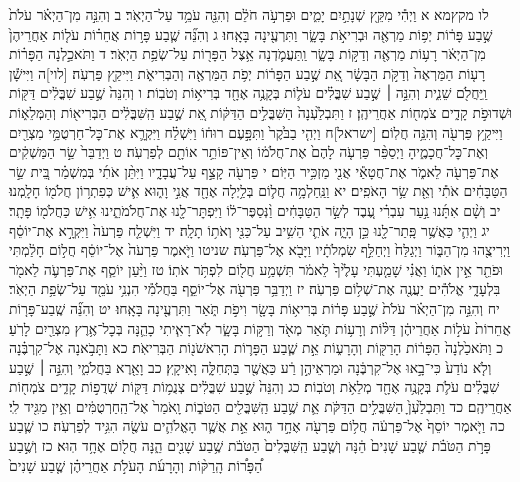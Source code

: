 \documentclass[twoside, openany, parskip=half, 11pt]{book}
\begin{document}
לו מקץמא א וַיְהִ֕י מִקֵּ֖ץ שְׁנָתַ֣יִם יָמִ֑ים וּפַרְעֹ֣ה חֹלֵ֔ם וְהִנֵּ֖ה עֹמֵ֥ד עַל־הַיְאֹֽר׃ ב וְהִנֵּ֣ה מִן־הַיְאֹ֗ר עֹלֹת֙ שֶׁ֣בַע פָּר֔וֹת יְפ֥וֹת מַרְאֶ֖ה וּבְרִיאֹ֣ת בָּשָׂ֑ר וַתִּרְעֶ֖ינָה בָּאָֽחוּ׃ ג וְהִנֵּ֞ה שֶׁ֧בַע פָּר֣וֹת אֲחֵר֗וֹת עֹל֤וֹת אַחֲרֵיהֶן֙ מִן־הַיְאֹ֔ר רָע֥וֹת מַרְאֶ֖ה וְדַקּ֣וֹת בָּשָׂ֑ר וַֽתַּעֲמֹ֛דְנָה אֵ֥צֶל הַפָּר֖וֹת עַל־שְׂפַ֥ת הַיְאֹֽר׃ ד וַתֹּאכַ֣לְנָה הַפָּר֗וֹת רָע֤וֹת הַמַּרְאֶה֙ וְדַקֹּ֣ת הַבָּשָׂ֔ר אֵ֚ת שֶׁ֣בַע הַפָּר֔וֹת יְפֹ֥ת הַמַּרְאֶ֖ה וְהַבְּרִיאֹ֑ת וַיִּיקַ֖ץ פַּרְעֹֽה׃ [לוי]ה וַיִּישָׁ֕ן וַֽיַּחֲלֹ֖ם שֵׁנִ֑ית וְהִנֵּ֣ה ׀ שֶׁ֣בַע שִׁבֳּלִ֗ים עֹל֛וֹת בְּקָנֶ֥ה אֶחָ֖ד בְּרִיא֥וֹת וְטֹבֽוֹת׃ ו וְהִנֵּה֙ שֶׁ֣בַע שִׁבֳּלִ֔ים דַּקּ֖וֹת וּשְׁדוּפֹ֣ת קָדִ֑ים צֹמְח֖וֹת אַחֲרֵיהֶֽן׃ ז וַתִּבְלַ֙עְנָה֙ הַשִּׁבֳּלִ֣ים הַדַּקּ֔וֹת אֵ֚ת שֶׁ֣בַע הַֽשִּׁבֳּלִ֔ים הַבְּרִיא֖וֹת וְהַמְּלֵא֑וֹת וַיִּיקַ֥ץ פַּרְעֹ֖ה וְהִנֵּ֥ה חֲלֽוֹם׃ [ישראל]ח וַיְהִ֤י בַבֹּ֙קֶר֙ וַתִּפָּ֣עֶם רוּח֔וֹ וַיִּשְׁלַ֗ח וַיִּקְרָ֛א אֶת־כׇּל־חַרְטֻמֵּ֥י מִצְרַ֖יִם וְאֶת־כׇּל־חֲכָמֶ֑יהָ וַיְסַפֵּ֨ר פַּרְעֹ֤ה לָהֶם֙ אֶת־חֲלֹמ֔וֹ וְאֵין־פּוֹתֵ֥ר אוֹתָ֖ם לְפַרְעֹֽה׃ ט וַיְדַבֵּר֙ שַׂ֣ר הַמַּשְׁקִ֔ים אֶת־פַּרְעֹ֖ה לֵאמֹ֑ר אֶת־חֲטָאַ֕י אֲנִ֖י מַזְכִּ֥יר הַיּֽוֹם׃ י פַּרְעֹ֖ה קָצַ֣ף עַל־עֲבָדָ֑יו וַיִּתֵּ֨ן אֹתִ֜י בְּמִשְׁמַ֗ר בֵּ֚ית שַׂ֣ר הַטַּבָּחִ֔ים אֹתִ֕י וְאֵ֖ת שַׂ֥ר הָאֹפִֽים׃ יא וַנַּֽחַלְמָ֥ה חֲל֛וֹם בְּלַ֥יְלָה אֶחָ֖ד אֲנִ֣י וָה֑וּא אִ֛ישׁ כְּפִתְר֥וֹן חֲלֹמ֖וֹ חָלָֽמְנוּ׃ יב וְשָׁ֨ם אִתָּ֜נוּ נַ֣עַר עִבְרִ֗י עֶ֚בֶד לְשַׂ֣ר הַטַּבָּחִ֔ים וַ֨נְּסַפֶּר־ל֔וֹ וַיִּפְתׇּר־לָ֖נוּ אֶת־חֲלֹמֹתֵ֑ינוּ אִ֥ישׁ כַּחֲלֹמ֖וֹ פָּתָֽר׃ יג וַיְהִ֛י כַּאֲשֶׁ֥ר פָּֽתַר־לָ֖נוּ כֵּ֣ן הָיָ֑ה אֹתִ֛י הֵשִׁ֥יב עַל־כַּנִּ֖י וְאֹת֥וֹ תָלָֽה׃ יד וַיִּשְׁלַ֤ח פַּרְעֹה֙ וַיִּקְרָ֣א אֶת־יוֹסֵ֔ף וַיְרִיצֻ֖הוּ מִן־הַבּ֑וֹר וַיְגַלַּח֙ וַיְחַלֵּ֣ף שִׂמְלֹתָ֔יו וַיָּבֹ֖א אֶל־פַּרְעֹֽה׃ שניטו וַיֹּ֤אמֶר פַּרְעֹה֙ אֶל־יוֹסֵ֔ף חֲל֣וֹם חָלַ֔מְתִּי וּפֹתֵ֖ר אֵ֣ין אֹת֑וֹ וַאֲנִ֗י שָׁמַ֤עְתִּי עָלֶ֙יךָ֙ לֵאמֹ֔ר תִּשְׁמַ֥ע חֲל֖וֹם לִפְתֹּ֥ר אֹתֽוֹ׃ טז וַיַּ֨עַן יוֹסֵ֧ף אֶת־פַּרְעֹ֛ה לֵאמֹ֖ר בִּלְעָדָ֑י אֱלֹהִ֕ים יַעֲנֶ֖ה אֶת־שְׁל֥וֹם פַּרְעֹֽה׃ יז וַיְדַבֵּ֥ר פַּרְעֹ֖ה אֶל־יוֹסֵ֑ף בַּחֲלֹמִ֕י הִנְנִ֥י עֹמֵ֖ד עַל־שְׂפַ֥ת הַיְאֹֽר׃ יח וְהִנֵּ֣ה מִן־הַיְאֹ֗ר עֹלֹת֙ שֶׁ֣בַע פָּר֔וֹת בְּרִיא֥וֹת בָּשָׂ֖ר וִיפֹ֣ת תֹּ֑אַר וַתִּרְעֶ֖ינָה בָּאָֽחוּ׃ יט וְהִנֵּ֞ה שֶֽׁבַע־פָּר֤וֹת אֲחֵרוֹת֙ עֹל֣וֹת אַחֲרֵיהֶ֔ן דַּלּ֨וֹת וְרָע֥וֹת תֹּ֛אַר מְאֹ֖ד וְרַקּ֣וֹת בָּשָׂ֑ר לֹֽא־רָאִ֧יתִי כָהֵ֛נָּה בְּכׇל־אֶ֥רֶץ מִצְרַ֖יִם לָרֹֽעַ׃ כ וַתֹּאכַ֙לְנָה֙ הַפָּר֔וֹת הָרַקּ֖וֹת וְהָרָע֑וֹת אֵ֣ת שֶׁ֧בַע הַפָּר֛וֹת הָרִאשֹׁנ֖וֹת הַבְּרִיאֹֽת׃ כא וַתָּבֹ֣אנָה אֶל־קִרְבֶּ֗נָה וְלֹ֤א נוֹדַע֙ כִּי־בָ֣אוּ אֶל־קִרְבֶּ֔נָה וּמַרְאֵיהֶ֣ן רַ֔ע כַּאֲשֶׁ֖ר בַּתְּחִלָּ֑ה וָאִיקָֽץ׃ כב וָאֵ֖רֶא בַּחֲלֹמִ֑י וְהִנֵּ֣ה ׀ שֶׁ֣בַע שִׁבֳּלִ֗ים עֹלֹ֛ת בְּקָנֶ֥ה אֶחָ֖ד מְלֵאֹ֥ת וְטֹבֽוֹת׃ כג וְהִנֵּה֙ שֶׁ֣בַע שִׁבֳּלִ֔ים צְנֻמ֥וֹת דַּקּ֖וֹת שְׁדֻפ֣וֹת קָדִ֑ים צֹמְח֖וֹת אַחֲרֵיהֶֽם׃ כד וַתִּבְלַ֙עְןָ֙ הַשִּׁבֳּלִ֣ים הַדַּקֹּ֔ת אֵ֛ת שֶׁ֥בַע הַֽשִּׁבֳּלִ֖ים הַטֹּב֑וֹת וָֽאֹמַר֙ אֶל־הַֽחַרְטֻמִּ֔ים וְאֵ֥ין מַגִּ֖יד לִֽי׃ כה וַיֹּ֤אמֶר יוֹסֵף֙ אֶל־פַּרְעֹ֔ה חֲל֥וֹם פַּרְעֹ֖ה אֶחָ֣ד ה֑וּא אֵ֣ת אֲשֶׁ֧ר הָאֱלֹהִ֛ים עֹשֶׂ֖ה הִגִּ֥יד לְפַרְעֹֽה׃ כו שֶׁ֧בַע פָּרֹ֣ת הַטֹּבֹ֗ת שֶׁ֤בַע שָׁנִים֙ הֵ֔נָּה וְשֶׁ֤בַע הַֽשִּׁבֳּלִים֙ הַטֹּבֹ֔ת שֶׁ֥בַע שָׁנִ֖ים הֵ֑נָּה חֲל֖וֹם אֶחָ֥ד הֽוּא׃ כז וְשֶׁ֣בַע הַ֠פָּר֠וֹת הָֽרַקּ֨וֹת וְהָרָעֹ֜ת הָעֹלֹ֣ת אַחֲרֵיהֶ֗ן שֶׁ֤בַע שָׁנִים֙ 
\end{document}
